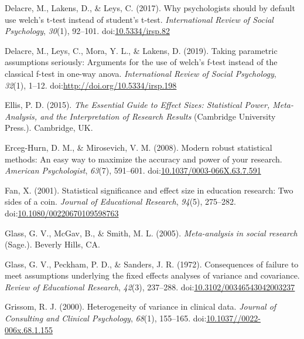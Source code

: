 \documentclass[
  man,floatsintext]{apa6}
\begin{document}
\leavevmode\hypertarget{ref-Delacre_et_al_2017}{}%
Delacre, M., Lakens, D., \& Leys, C. (2017). Why psychologists should by default use welch's t-test instead of student's t-test. \emph{International Review of Social Psychology}, \emph{30}(1), 92--101. doi:\href{https://doi.org/10.5334/irsp.82}{10.5334/irsp.82}

\leavevmode\hypertarget{ref-Delacre_et_al_2019}{}%
Delacre, M., Leys, C., Mora, Y. L., \& Lakens, D. (2019). Taking parametric assumptions seriously: Arguments for the use of welch's f-test instead of the classical f-test in one-way anova. \emph{International Review of Social Psychology}, \emph{32}(1), 1--12. doi:\href{https://doi.org/http://doi.org/10.5334/irsp.198}{http://doi.org/10.5334/irsp.198}

\leavevmode\hypertarget{ref-Ellis_2015}{}%
Ellis, P. D. (2015). \emph{The Essential Guide to Effect Sizes: Statistical Power, Meta-Analysis, and the Interpretation of Research Results} (Cambridge University Press.). Cambridge, UK.

\leavevmode\hypertarget{ref-Erceg-Hurn_Mirosevich_2008}{}%
Erceg-Hurn, D. M., \& Mirosevich, V. M. (2008). Modern robust statistical methods: An easy way to maximize the accuracy and power of your research. \emph{American Psychologist}, \emph{63}(7), 591--601. doi:\href{https://doi.org/10.1037/0003-066X.63.7.591}{10.1037/0003-066X.63.7.591}

\leavevmode\hypertarget{ref-Fan_2001}{}%
Fan, X. (2001). Statistical significance and effect size in education research: Two sides of a coin. \emph{Journal of Educational Research}, \emph{94}(5), 275--282. doi:\href{https://doi.org/10.1080/00220670109598763}{10.1080/00220670109598763}

\leavevmode\hypertarget{ref-Glass_et_al_1981}{}%
Glass, G. V., McGav, B., \& Smith, M. L. (2005). \emph{Meta-analysis in social research} (Sage.). Beverly Hills, CA.

\leavevmode\hypertarget{ref-Glass_et_al_1972}{}%
Glass, G. V., Peckham, P. D., \& Sanders, J. R. (1972). Consequences of failure to meet assumptions underlying the fixed effects analyses of variance and covariance. \emph{Review of Educational Research}, \emph{42}(3), 237--288. doi:\href{https://doi.org/10.3102/00346543042003237}{10.3102/00346543042003237}

\leavevmode\hypertarget{ref-Grissom_2000}{}%
Grissom, R. J. (2000). Heterogeneity of variance in clinical data. \emph{Journal of Consulting and Clinical Psychology}, \emph{68}(1), 155--165. doi:\href{https://doi.org/10.1037//0022-006x.68.1.155}{10.1037//0022-006x.68.1.155}
\end{document}
